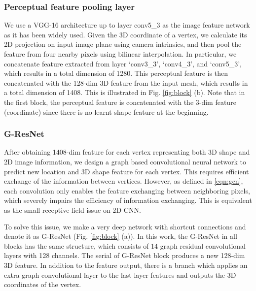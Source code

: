 \documentclass[runningheads]{llncs}
\newcommand{\figref}[1]{Fig. \ref{#1}}
\begin{document}
\subsubsection{Perceptual feature pooling layer}
We use a VGG-16 architecture up to layer conv5\_3 as the image feature network as it has been widely used.
Given the 3D coordinate of a vertex, we calculate its 2D projection on input image plane using camera intrinsics, and then pool the feature from four nearby pixels using bilinear interpolation. In particular, we concatenate feature extracted from layer `conv3\_3', `conv4\_3', and `conv5\_3', which results in a total dimension of 1280.
This perceptual feature is then concatenated with the 128-dim 3D feature from the input mesh, which results in a total dimension of 1408. This is illustrated in \figref{fig:block} (b). Note that in the first block, the perceptual feature is concatenated with the 3-dim feature (coordinate) since there is no learnt shape feature at the beginning.



\subsubsection{G-ResNet}
After obtaining 1408-dim feature for each vertex representing both 3D shape and 2D image information, we design a graph based convolutional neural network to predict new location and 3D shape feature for each vertex.
This requires efficient exchange of the information between vertices.
However, as defined in \eqref{eqn:gcn}, each convolution only enables the feature exchanging between neighboring pixels, which severely impairs the efficiency of information exchanging. This is equivalent as the small receptive field issue on 2D CNN.

To solve this issue, we make a very deep network with shortcut connections \cite{HeZRS16} and denote it as G-ResNet (\figref{fig:block} (a)). In this work, the G-ResNet in all blocks has the same structure, which consists of 14 graph residual convolutional layers with 128 channels. The serial of G-ResNet block produces a new 128-dim 3D feature. In addition to the feature output, there is a branch which applies an extra graph convolutional layer to the last layer features and outputs the 3D coordinates of the vertex.
\end{document}
